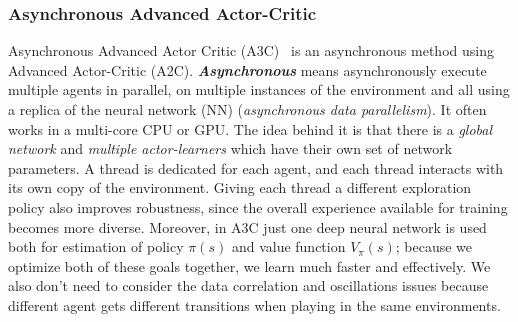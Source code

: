 \subsubsection{Asynchronous Advanced Actor-Critic}
Asynchronous Advanced Actor Critic (A3C)~\parencite{mnih2016asynchronous} is an asynchronous method using Advanced Actor-Critic (A2C). \textit{\textbf{Asynchronous}} means asynchronously execute multiple agents in parallel, on multiple instances of the environment and all using a replica of the neural network (NN) (\textit{asynchronous data parallelism}). It often works in a multi-core CPU or GPU. The idea behind it is that there is a \textit{global network} and \textit{multiple actor-learners} which have their own set of network parameters. A thread is dedicated for each agent, and each thread interacts with its own copy of the environment.
Giving each thread a different exploration policy also improves robustness, since the overall experience available for training becomes more diverse. Moreover, in A3C just one deep neural network is used both for estimation of policy $\pi(s)$ and value function $V_{\pi}(s)$; because we optimize both of these goals together, we learn much faster and effectively. We also don’t need to consider the data correlation and oscillations issues because different agent gets different transitions when playing in the same environments.

